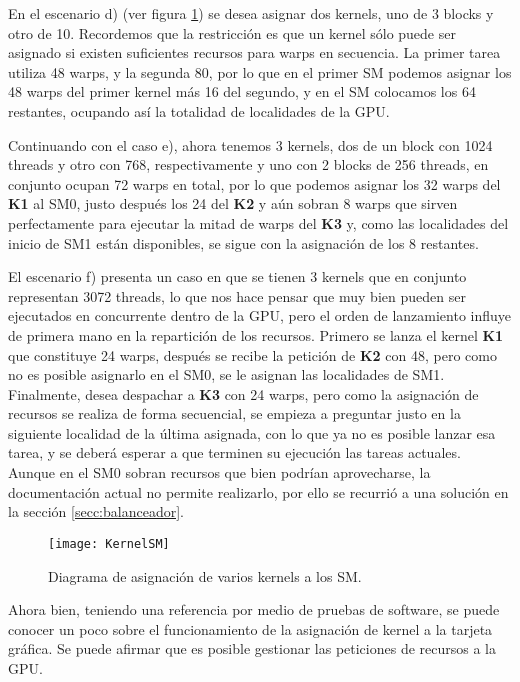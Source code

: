     En el escenario d) (ver figura \ref{fig:KernelSM}) se desea asignar dos kernels, uno de 3 blocks y otro de 10. Recordemos que la restricción es que un kernel sólo puede ser asignado si existen suficientes recursos para warps en secuencia. La primer tarea utiliza 48 warps, y la segunda 80, por lo que en el primer SM podemos asignar los 48 warps del primer kernel más 16 del segundo, y en el SM colocamos los 64 restantes, ocupando así la totalidad de localidades de la GPU.
    \newline
    
    Continuando con el caso e), ahora tenemos 3 kernels, dos de un block con 1024 threads y otro con 768, respectivamente y uno con 2 blocks de 256 threads, en conjunto ocupan 72 warps en total, por lo que podemos asignar los 32 warps del \textbf{K1} al SM0, justo después los 24 del \textbf{K2} y aún sobran 8 warps que sirven perfectamente para ejecutar la mitad de warps del \textbf{K3} y, como las localidades del inicio de SM1 están disponibles, se sigue con la asignación de los 8 restantes.
    \newline
    
    El escenario f) presenta un caso en que se tienen 3 kernels que en conjunto representan 3072 threads, lo que nos hace pensar que muy bien pueden ser ejecutados en concurrente dentro de la GPU, pero el orden de lanzamiento influye de primera mano en la repartición de los recursos. Primero se lanza el kernel \textbf{K1} que constituye 24 warps, después se recibe la petición de  \textbf{K2} con 48, pero como no es posible asignarlo en el SM0, se le asignan las localidades de SM1. Finalmente, desea despachar a \textbf{K3} con 24 warps, pero como la asignación de recursos se realiza de forma secuencial, se empieza a preguntar justo en la siguiente localidad de la última asignada, con lo que ya no es posible lanzar esa tarea, y se deberá esperar a que terminen su ejecución las tareas actuales. Aunque en el SM0 sobran recursos que bien podrían aprovecharse, la documentación actual no permite realizarlo, por ello se recurrió a una solución en la sección \ref{secc:balanceador}.
    
    \begin{figure}[ht]
      \centering
        \texttt{[image: KernelSM]}
        \caption{Diagrama de asignación de varios kernels a los SM.}
        \label{fig:KernelSM}
    \end{figure}
   
   Ahora bien, teniendo una referencia por medio de pruebas de software, se puede conocer un poco sobre el funcionamiento de la asignación de kernel a la tarjeta gráfica. Se puede afirmar que es posible gestionar las peticiones de recursos a la GPU.
\newline
    
